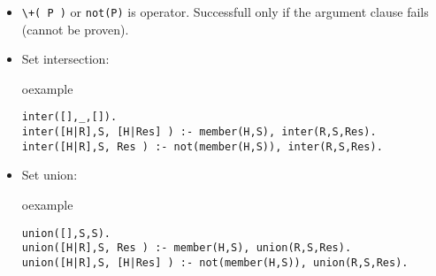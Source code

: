 \begin{frame}[fragile]
\begin{itemize}
\item \lstinline!\+( P )!  or \lstinline!not(P)! is  operator. Successfull only if the argument clause fails (cannot be proven).
\item Set intersection:\\
\begin{beamercolorbox}{oexample}
\begin{lstlisting}[escapeinside=`']
inter([],_,[]).
inter([H|R],S, [H|Res] ) :- member(H,S), inter(R,S,Res).
inter([H|R],S, Res ) :- not(member(H,S)), inter(R,S,Res).
\end{lstlisting}
\end{beamercolorbox}
\item Set union:\\
\begin{beamercolorbox}{oexample}
\begin{lstlisting}[escapeinside=`']
union([],S,S).
union([H|R],S, Res ) :- member(H,S), union(R,S,Res).
union([H|R],S, [H|Res] ) :- not(member(H,S)), union(R,S,Res).
\end{lstlisting}
\end{beamercolorbox}
\end{itemize}
\end{frame}

